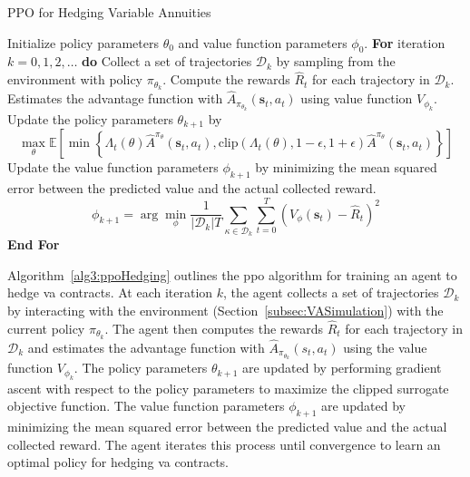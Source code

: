 \begin{algorithm} 
    \caption{PPO for Hedging Variable Annuities} 
    \begin{algorithmic}[1] \label{alg3:ppoHedging}
        \STATE  Initialize policy parameters $\theta_0$ and value function parameters $\phi_0$.
        \STATE  \textbf{For} {iteration $k=0, 1,2,\ldots$} \textbf{do}
        \STATE  \quad Collect a set of trajectories $\mathcal{D}_k$ by sampling from the environment with policy $\pi_{\theta_{k}}$.
        \STATE  \quad Compute the rewards $\hat{R}_t$ for each trajectory in $\mathcal{D}_k$.
        \STATE  \quad Estimates the advantage function with $\hat{A}_{\pi_{\theta_k}}(\mathbf{s}_t, a_t)$ using value function $V_{\phi_k}$.
        \STATE  \quad Update the policy parameters $\theta_{k+1}$ by 
        \begin{equation*}
            \max_{\theta} \mathbb{E}\left[ \min \left\{ \Lambda_t(\theta)\hat{A}^{\pi_{\theta}}(\mathbf{s}_t, a_t), \text{clip}(\Lambda_t(\theta), 1-\epsilon, 1 + \epsilon) \hat{A}^{\pi_{\theta}}(\mathbf{s}_t, a_t)  \right\} \right]
        \end{equation*}
        \STATE  \quad Update the value function parameters $\phi_{k+1}$ by minimizing the mean squared error between the predicted value and the actual collected reward.
        \begin{equation*}
            \phi_{k+1} = \arg \min_{\phi} \frac{1}{|\mathcal{D}_k|T} \sum_{\mathcal{\kappa} \in \mathcal{D}_k} \sum_{t=0}^{T} \left( V_{\phi}(\mathbf{s}_t) - \hat{R}_t \right)^2
        \end{equation*}
        \STATE  \textbf{End For}
    \end{algorithmic}
\end{algorithm}

Algorithm~\ref{alg3:ppoHedging} outlines the \gls{ppo} algorithm for training an agent to hedge \gls{va} contracts.
At each iteration $k$, the agent collects a set of trajectories $\mathcal{D}_k$ by interacting with the environment (Section~\ref{subsec:VASimulation}) with the current policy $\pi_{\theta_k}$.
The agent then computes the rewards $\hat{R}_t$ for each trajectory in $\mathcal{D}_k$ and estimates the advantage function with $\hat{A}_{\pi_{\theta_k}}(s_t, a_t)$ using the value function $V_{\phi_k}$.
The policy parameters $\theta_{k+1}$ are updated by performing gradient ascent with respect to the policy parameters to maximize the clipped surrogate objective function.
The value function parameters $\phi_{k+1}$ are updated by minimizing the mean squared error between the predicted value and the actual collected reward.
The agent iterates this process until convergence to learn an optimal policy for hedging \gls{va} contracts.

